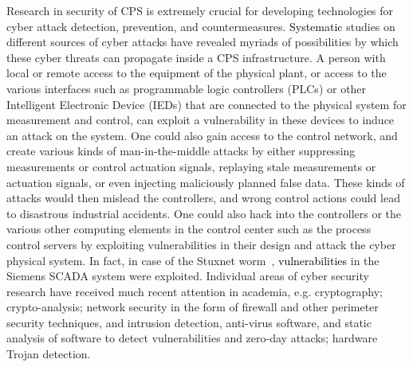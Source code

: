 \noindent
Research in security of CPS is 
extremely crucial for developing technologies for cyber attack detection, prevention, and countermeasures. \textcolor{black} {Systematic} studies on different sources of cyber attacks have revealed myriads of possibilities by which these cyber threats can 
propagate inside a CPS infrastructure. 
A person with local or remote access
to the equipment of the physical plant, or access to the various interfaces such as programmable
logic controllers (PLCs) or other Intelligent Electronic Device (IEDs) that are connected to the
physical system for measurement and control, can exploit a vulnerability in these devices to
induce an attack on the system. One could also gain access to the control network, and create
various kinds of man-in-the-middle attacks by either suppressing measurements or control
actuation signals, replaying stale measurements or actuation signals, or even injecting
maliciously planned false data. These kinds of attacks would then mislead the controllers, and
wrong control actions could lead to disastrous industrial accidents. One could also hack into the
controllers or the various other computing elements in the control center such as the process control servers by
exploiting vulnerabilities in their design and attack the cyber physical system. In fact, in
case of the Stuxnet worm~\cite{stuxnet}, \textcolor{black} {vulnerabilities} in the Siemens SCADA system were exploited. Individual areas of cyber security research have received
much recent attention in academia, e.g. cryptography; crypto-analysis; network
security in the form of firewall and other perimeter security techniques, and intrusion detection, anti-virus software, and static analysis of software to detect vulnerabilities and zero-day attacks;
hardware Trojan detection. \\ 

